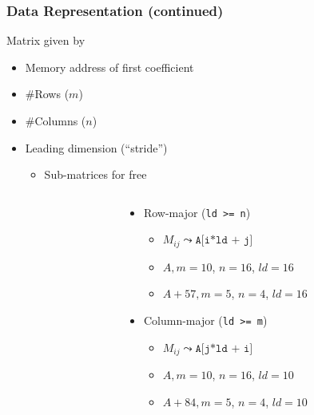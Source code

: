\documentclass[xcolor={rgb,x11names,svgnames},rgb,x11names,svgnames]{beamer}
\newcommand{\tikzmat}[2] {
\draw[thick] let \p1 = (#1 |- #2),
                 \p2 = (#2 |- #1) in
   ($ (#1) + (0.05,-0.1) $) -- ++(-0.15, 0)  -- ($ (\p1) + (-0.1,0.1) $) -- ++(0.15,0)
   ($ (\p2) + (-0.05,-0.1) $) -- ++(0.15, 0) -- ($ (#2) + (0.1,0.1) $) -- ++(-0.15,0);
}
\begin{document}
\begin{frame}[label=blasdata,fragile]
  \frametitle{Data Representation (continued)}

  \begin{exampleblock}{Matrix given by}
    \begin{itemize}
    \item Memory address of first coefficient
    \item \#Rows ($m$)
    \item \#Columns ($n$)
    \item Leading dimension (``stride'')
      \begin{itemize}
      \item Sub-matrices for free
      \end{itemize}
    \end{itemize}
  \end{exampleblock}

  \begin{columns}
    \begin{column}{5.33cm}
    \end{column}
    \begin{column}{6.66cm}
      \begin{itemize}
      \item Row-major (\texttt{ld >= n})
        \begin{itemize}
        \item $M_{ij} \leadsto \texttt{A[i*ld + j]}$
        \item {\color{Gray} $A, m = 10$, $n = 16$, $ld = 16$}
        \item<2-> {\color{blue} $A + 57, m = 5$, $n = 4$, $ld = 16$}
        \end{itemize}
      \item Column-major (\texttt{ld >= m})      
        \begin{itemize}
        \item $M_{ij} \leadsto \texttt{A[j*ld + i]}$
        \item {\color{Gray} $A, m = 10$, $n = 16$, $ld = 10$}
        \item<2-> {\color{blue} $A + 84, m = 5$, $n = 4$, $ld = 10$}
        \end{itemize}
      \end{itemize}  
    \end{column}
  \end{columns}
\end{frame}
\end{document}
